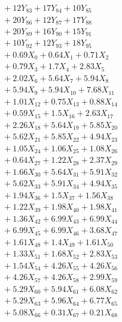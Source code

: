\documentclass[a4paper,10pt]{article}
\begin{document}
{\begin{align}
&\;  + 12 Y_{83} + 17 Y_{84} + 10 Y_{85} \\[0.3ex]
&\;  + 20 Y_{86} + 12 Y_{87} + 17 Y_{88} \\[0.5ex]\allowbreak
&\;  + 20 Y_{89} + 16 Y_{90} + 15 Y_{91} \\[0.3ex]
&\;  + 10 Y_{92} + 12 Y_{93} + 18 Y_{95} \\[0.3ex]
&\;  + 0.69 X_{0} + 0.64 X_{1} + 0.71 X_{2} \\[0.3ex]
&\;  + 0.79 X_{3} + 1.7 X_{4} + 2.83 X_{5} \\[0.3ex]
&\;  + 2.02 X_{6} + 5.64 X_{7} + 5.94 X_{8} \\[0.3ex]
&\;  + 5.94 X_{9} + 5.94 X_{10} + 7.68 X_{11} \\[0.3ex]
&\;  + 1.01 X_{12} + 0.75 X_{13} + 0.88 X_{14} \\[0.3ex]
&\;  + 0.59 X_{15} + 1.5 X_{16} + 2.63 X_{17} \\[0.3ex]
&\;  + 2.26 X_{18} + 5.64 X_{19} + 5.85 X_{20} \\[0.3ex]
&\;  + 5.62 X_{21} + 5.85 X_{22} + 4.94 X_{23} \\[0.5ex]\allowbreak
&\;  + 1.05 X_{24} + 1.06 X_{25} + 1.08 X_{26} \\[0.3ex]
&\;  + 0.64 X_{27} + 1.22 X_{28} + 2.37 X_{29} \\[0.3ex]
&\;  + 1.66 X_{30} + 5.64 X_{31} + 5.91 X_{32} \\[0.3ex]
&\;  + 5.62 X_{33} + 5.91 X_{34} + 4.94 X_{35} \\[0.3ex]
&\;  + 1.94 X_{36} + 1.5 X_{37} + 1.56 X_{38} \\[0.3ex]
&\;  + 1.22 X_{39} + 1.98 X_{40} + 1.98 X_{41} \\[0.3ex]
&\;  + 1.36 X_{42} + 6.99 X_{43} + 6.99 X_{44} \\[0.3ex]
&\;  + 6.99 X_{45} + 6.99 X_{46} + 3.68 X_{47} \\[0.3ex]
&\;  + 1.61 X_{48} + 1.4 X_{49} + 1.61 X_{50} \\[0.3ex]
&\;  + 1.33 X_{51} + 1.68 X_{52} + 2.83 X_{53} \\[0.5ex]\allowbreak
&\;  + 1.54 X_{54} + 4.26 X_{55} + 4.26 X_{56} \\[0.3ex]
&\;  + 4.26 X_{57} + 4.26 X_{58} + 2.99 X_{59} \\[0.3ex]
&\;  + 5.29 X_{60} + 5.94 X_{61} + 6.08 X_{62} \\[0.3ex]
&\;  + 5.29 X_{63} + 5.96 X_{64} + 6.77 X_{65} \\[0.3ex]
&\;  + 5.08 X_{66} + 0.31 X_{67} + 0.21 X_{68} \\[0.3ex]

\end{align}}
\end{document}
